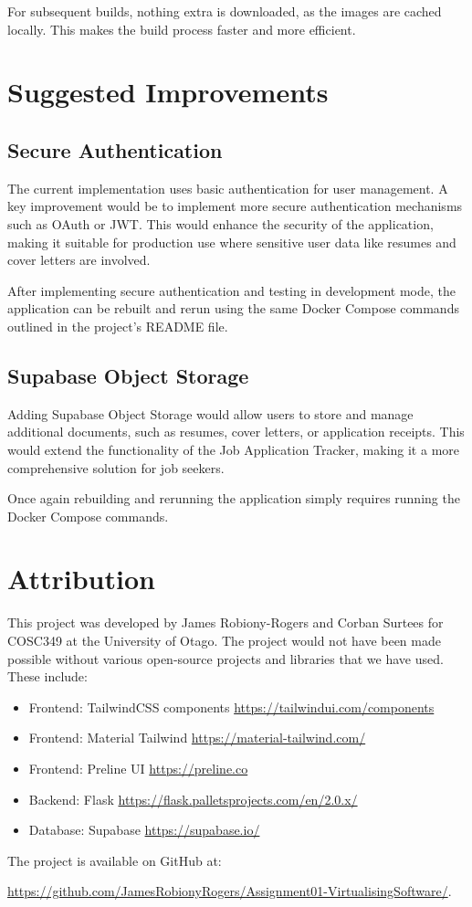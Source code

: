 \documentclass[a4paper, 11pt]{article}
\begin{document}
For subsequent builds, nothing extra is downloaded, as the images are cached locally. This makes the build process faster and more efficient.

\section{Suggested Improvements}

\subsection{Secure Authentication}
The current implementation uses basic authentication for user management. A key improvement would be to implement more secure authentication mechanisms such as OAuth or JWT. This would enhance the security of the application, making it suitable for production use where sensitive user data like resumes and cover letters are involved.

After implementing secure authentication and testing in development mode, the application can be rebuilt and rerun using the same Docker Compose commands outlined in the project's README file.

\subsection{Supabase Object Storage}
Adding Supabase Object Storage would allow users to store and manage additional documents, such as resumes, cover letters, or application receipts. This would extend the functionality of the Job Application Tracker, making it a more comprehensive solution for job seekers. 

Once again rebuilding and rerunning the application simply requires running the Docker Compose commands.


\section{Attribution}
This project was developed by James Robiony-Rogers and Corban Surtees for COSC349 at the University of Otago. The project would not have been made possible without various open-source projects and libraries that we have used. These include: 


\begin{itemize}
    \item Frontend: TailwindCSS components \url{https://tailwindui.com/components}
    \item Frontend: Material Tailwind \url{https://material-tailwind.com/}
    \item Frontend: Preline UI \url{https://preline.co}
    \item Backend: Flask \url{https://flask.palletsprojects.com/en/2.0.x/}
    \item Database: Supabase \url{https://supabase.io/}
\end{itemize}

The project is available on GitHub at:

\url{https://github.com/JamesRobionyRogers/Assignment01-VirtualisingSoftware/}.
\end{document}
